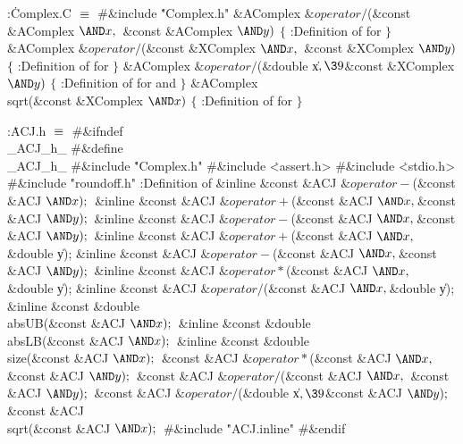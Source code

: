 \B{}:\.{Complex.C }\X${}\equiv{}$\6
\8\#\&{include} \.{"Complex.h"}\6
\&{AComplex} ${}\&{operator}{/}{}$(\&{const} \&{AComplex} ${}{\AND}\|x,\39{}$%
\&{const} \&{AComplex} ${}{\AND}\|y){}$\1\1\2\2\6
${}\{{}$\1\6
:Definition of  for \X\6
\4${}\}{}$\2\7
\&{AComplex} ${}\&{operator}{/}{}$(\&{const} \&{XComplex} ${}{\AND}\|x,\39{}$%
\&{const} \&{XComplex} ${}{\AND}\|y){}$\1\1\2\2\6
${}\{{}$\1\6
:Definition of  for \X\6
\4${}\}{}$\2\7
\&{AComplex} ${}\&{operator}{/}{}$(\&{double} \|x${},\39{}$\&{const} %
\&{XComplex} ${}{\AND}\|y){}$\1\1\2\2\6
${}\{{}$\1\6
:Definition of  for  and \X\6
\4${}\}{}$\2\7
\&{AComplex} \\{sqrt}(\&{const} \&{XComplex} ${}{\AND}\|x){}$\1\1\2\2\6
${}\{{}$\1\6
:Definition of  for \X\6
\4${}\}{}$\2\par
\fi

\B{}:\.{ACJ.h }\X${}\equiv{}$\6
\8\#\&{ifndef} \\{\_ACJ\_h\_}\6
\8\#\&{define} \\{\_ACJ\_h\_}\6
\8\#\&{include} \.{"Complex.h"}\6
\8\#\&{include} \.{<assert.h>}\6
\8\#\&{include} \.{<stdio.h>}\6
\8\#\&{include} \.{"roundoff.h"}\6
:Definition of \X\7
\&{inline} \&{const} \&{ACJ} ${}\&{operator}{-}{}$(\&{const} \&{ACJ} ${}{\AND}%
\|x);{}$\6
\&{inline} \&{const} \&{ACJ} ${}\&{operator}{+}{}$(\&{const} \&{ACJ} ${}{\AND}%
\|x,\39{}$\&{const} \&{ACJ} ${}{\AND}\|y);{}$\6
\&{inline} \&{const} \&{ACJ} ${}\&{operator}{-}{}$(\&{const} \&{ACJ} ${}{\AND}%
\|x,\39{}$\&{const} \&{ACJ} ${}{\AND}\|y);{}$\6
\&{inline} \&{const} \&{ACJ} ${}\&{operator}{+}{}$(\&{const} \&{ACJ} ${}{\AND}%
\|x,\39{}$\&{double} \|y);\6
\&{inline} \&{const} \&{ACJ} ${}\&{operator}{-}{}$(\&{const} \&{ACJ} ${}{\AND}%
\|x,\39{}$\&{const} \&{ACJ} ${}{\AND}\|y);{}$\6
\&{inline} \&{const} \&{ACJ} ${}\&{operator}*{}$(\&{const} \&{ACJ} ${}{\AND}%
\|x,\39{}$\&{double} \|y);\6
\&{inline} \&{const} \&{ACJ} ${}\&{operator}{/}{}$(\&{const} \&{ACJ} ${}{\AND}%
\|x,\39{}$\&{double} \|y);\6
\&{inline} \&{const} \&{double} \\{absUB}(\&{const} \&{ACJ} ${}{\AND}\|x);{}$\6
\&{inline} \&{const} \&{double} \\{absLB}(\&{const} \&{ACJ} ${}{\AND}\|x);{}$\6
\&{inline} \&{const} \&{double} \\{size}(\&{const} \&{ACJ} ${}{\AND}\|x);{}$\6
\&{const} \&{ACJ} ${}\&{operator}*{}$(\&{const} \&{ACJ} ${}{\AND}\|x,\39{}$%
\&{const} \&{ACJ} ${}{\AND}\|y);{}$\6
\&{const} \&{ACJ} ${}\&{operator}{/}{}$(\&{const} \&{ACJ} ${}{\AND}\|x,\39{}$%
\&{const} \&{ACJ} ${}{\AND}\|y);{}$\6
\&{const} \&{ACJ} ${}\&{operator}{/}{}$(\&{double} \|x${},\39{}$\&{const} %
\&{ACJ} ${}{\AND}\|y);{}$\6
\&{const} \&{ACJ} \\{sqrt}(\&{const} \&{ACJ} ${}{\AND}\|x);{}$\6
\8\#\&{include} \.{"ACJ.inline"}\6
\8\#\&{endif}\par
\fi

